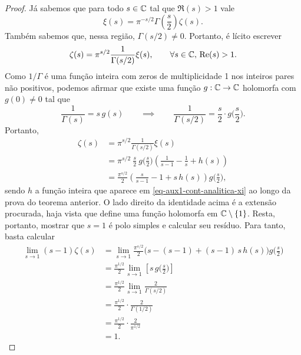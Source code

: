     \begin{proof}
        Já sabemos que para todo $s\in\mathbb{C}$ tal que $\Re(s) > 1$ vale
        \[
        \xi(s) = \pi^{-s/2}\Gamma\left(\frac{s}{2}\right)\zeta(s).
        \]
        Também sabemos que, nessa região, $\Gamma(s/2)\neq 0$. Portanto, é lícito escrever
        \[
        \zeta(s) 
        = 
        \pi^{s/2}\frac{1}{\Gamma(s/2)}\xi(s), 
        \qquad \forall s\in\mathbb{C}, \, \mathrm{Re}(s) > 1.
        \]
        Como $1/\Gamma$ é uma função inteira com zeros 
        de multiplicidade 1 nos inteiros pares não positivos,
        podemos afirmar 
        que existe uma função 
        $g:\mathbb{C}\to\mathbb{C}$ holomorfa com $g(0)\neq 0$ tal que
        \[
        \frac{1}{\Gamma(s)} = s\, g(s) 
        \qquad\implies\qquad
        \frac{1}{\Gamma(s/2)} = \frac{s}{2}\cdot g\Big(\frac{s}{2}\Big).
        \]
        Portanto,
        \begin{align*}
            \zeta(s) &= 
            \pi^{s/2}\frac{1}{\Gamma(s/2)}\xi(s)
            \\[0.3cm]
            &=
            \pi^{s/2}\ \frac{s}{2}\ g\Big(\frac{s}{2}\Big)
            \left( \frac{1}{s-1} - \frac{1}{s} + h(s) \right) 
            \\[0.3cm]
            &= \frac{\pi^{s/2}}{2}\left( \frac{s}{s-1} - 1 + s\, h(s) \right)g\Big(\frac{s}{2}\Big),
        \end{align*}
        sendo $h$ a função inteira que aparece em \eqref{eq-aux1-cont-analitica-xi} 
        ao longo 
        da prova do teorema anterior. 
        O lado direito da identidade acima
        é a extensão procurada, 
        haja vista que define uma função holomorfa em $\mathbb{C}\setminus\{1\}$.
        Resta, portanto, mostrar que $s=1$ é 
        polo simples e calcular seu resíduo. Para tanto,
        basta calcular
        \begin{align*}
            \lim_{s\to 1} (s-1)\zeta(s) 
            &= \lim_{s\to 1} \frac{\pi^{s/2}}{2}\Big( s - (s-1) + (s-1)\,s\,h(s) \Big)g\Big(\frac{s}{2}\Big)\\[0.3cm]
            &= \frac{\pi^{1/2}}{2}\lim_{s\to 1} \left[ s\, g\Big(\frac{s}{2}\Big)\right] \\[0.3cm]
            &= \frac{\pi^{1/2}}{2}\lim_{s\to 1} \frac{2}{\Gamma(s/2)} \\[0.3cm]
            &= \frac{\pi^{1/2}}{2}\cdot\frac{2}{\Gamma(1/2)} \\[0.3cm]
            &= \frac{\pi^{1/2}}{2}\cdot\frac{2}{\pi^{1/2}} \\[0.3cm]
            &= 1.
        \end{align*}
    \end{proof}
